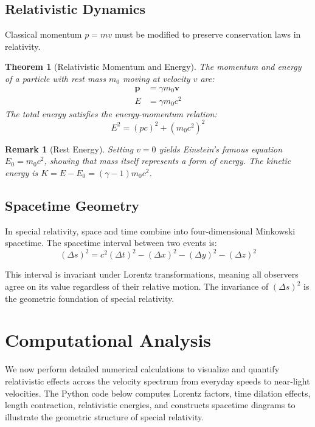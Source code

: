 \documentclass[a4paper, 11pt]{article}
\newtheorem{theorem}{Theorem}[section]
\newtheorem{remark}{Remark}[section]
\begin{document}
\subsection{Relativistic Dynamics}

Classical momentum $p = mv$ must be modified to preserve conservation laws in relativity.

\begin{theorem}[Relativistic Momentum and Energy]
The momentum and energy of a particle with rest mass $m_0$ moving at velocity $v$ are:
\begin{align}
\mathbf{p} &= \gamma m_0 \mathbf{v} \\
E &= \gamma m_0 c^2
\end{align}
The total energy satisfies the energy-momentum relation:
\begin{equation}
E^2 = (pc)^2 + (m_0 c^2)^2
\end{equation}
\end{theorem}

\begin{remark}[Rest Energy]
Setting $v = 0$ yields Einstein's famous equation $E_0 = m_0 c^2$, showing that mass itself
represents a form of energy. The kinetic energy is $K = E - E_0 = (\gamma - 1)m_0 c^2$.
\end{remark}

\subsection{Spacetime Geometry}

In special relativity, space and time combine into four-dimensional Minkowski spacetime.
The spacetime interval between two events is:
\begin{equation}
(\Delta s)^2 = c^2(\Delta t)^2 - (\Delta x)^2 - (\Delta y)^2 - (\Delta z)^2
\end{equation}

This interval is invariant under Lorentz transformations, meaning all observers agree on its
value regardless of their relative motion. The invariance of $(\Delta s)^2$ is the geometric
foundation of special relativity.

\section{Computational Analysis}

We now perform detailed numerical calculations to visualize and quantify relativistic effects
across the velocity spectrum from everyday speeds to near-light velocities. The Python code
below computes Lorentz factors, time dilation effects, length contraction, relativistic
energies, and constructs spacetime diagrams to illustrate the geometric structure of special relativity.
\end{document}
